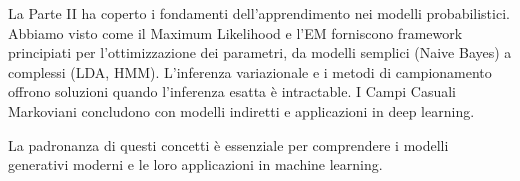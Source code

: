 La Parte II ha coperto i fondamenti dell'apprendimento nei modelli probabilistici. Abbiamo visto come il Maximum Likelihood e l'EM forniscono framework principiati per l'ottimizzazione dei parametri, da modelli semplici (Naive Bayes) a complessi (LDA, HMM). L'inferenza variazionale e i metodi di campionamento offrono soluzioni quando l'inferenza esatta è intractable. I Campi Casuali Markoviani concludono con modelli indiretti e applicazioni in deep learning.

La padronanza di questi concetti è essenziale per comprendere i modelli generativi moderni e le loro applicazioni in machine learning.
